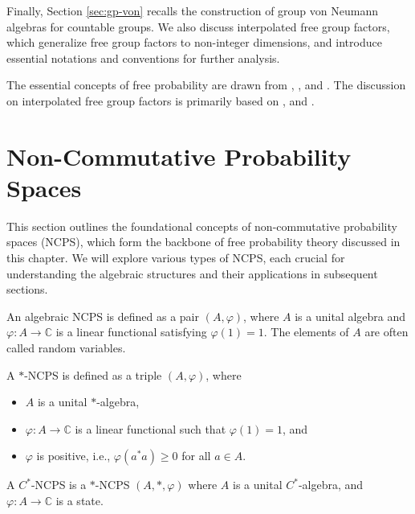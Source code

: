 Finally, Section \ref{sec:gp-von} recalls the construction of group von Neumann algebras for countable groups. We also discuss interpolated free group factors, which generalize free group factors to non-integer dimensions, and introduce essential notations and conventions for further analysis.


The essential concepts of free probability are drawn from \cite{mingo2017}, \cite{nicaspec}, and \cite{voiculescu1992free}. The discussion on interpolated free group factors is primarily based on \cite{LFdyk}, \cite{mingo2017} and \cite{Radulesc}.



\section{Non-Commutative Probability Spaces}\label{sec:NCPS}

This section outlines the foundational concepts of non-commutative probability spaces (NCPS), which form the backbone of free probability theory discussed in this chapter. We will explore various types of NCPS, each crucial for understanding the algebraic structures and their applications in subsequent sections.


\begin{definition}
An algebraic NCPS is defined as a pair $(A, \varphi)$, where $A$ is a unital algebra and $\varphi: A \rightarrow \mathbb{C}$ is a linear functional satisfying $\varphi(1) = 1$.
        The elements of $A$ are often called random variables.
\end{definition}

\begin{definition}[$*$-NCPS]
A $*$-NCPS is defined as a triple $(A,\varphi)$, where
\begin{itemize}
    \item $A$ is a unital $*$-algebra,
    \item $\varphi: A \rightarrow \mathbb{C}$ is a linear functional such that $\varphi(1) = 1$, and
    \item $\varphi$ is positive, i.e., $\varphi(a^*a) \geq 0$ for all $a \in A$.
\end{itemize}
\end{definition}

\begin{definition}[$C^*$-NCPS]
A $C^*$-NCPS is a $*$-NCPS $(A, *, \varphi)$ where $A$ is a unital $C^*$-algebra, and $\varphi: A \rightarrow \mathbb{C}$ is a state.
\end{definition}

